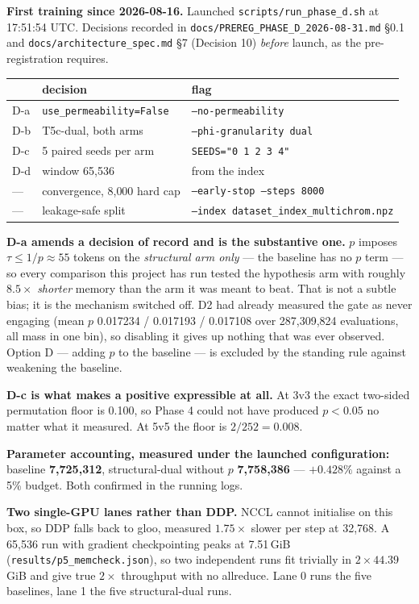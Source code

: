 \documentclass[11pt,a4paper]{article}
\newcommand{\code}[1]{\texttt{\small #1}}
\begin{document}
\textbf{First training since 2026-08-16.} Launched
\code{scripts/run\_phase\_d.sh} at 17:51:54 UTC. Decisions recorded in
\code{docs/PREREG\_PHASE\_D\_2026-08-31.md} \S0.1 and
\code{docs/architecture\_spec.md} \S7 (Decision 10) \emph{before} launch, as the
pre-registration requires.

\begin{center}
\begin{tabular}{lll}
\hline
 & decision & flag \\
\hline
D-a & \code{use\_permeability=False} & \code{--no-permeability} \\
D-b & T5c-dual, both arms & \code{--phi-granularity dual} \\
D-c & 5 paired seeds per arm & \code{SEEDS="0 1 2 3 4"} \\
D-d & window 65{,}536 & from the index \\
--- & convergence, 8{,}000 hard cap & \code{--early-stop --steps 8000} \\
--- & leakage-safe split & \code{--index dataset\_index\_multichrom.npz} \\
\hline
\end{tabular}
\end{center}

\textbf{D-a amends a decision of record and is the substantive one.} $p$
imposes $\tau \le 1/p \approx 55$ tokens on the \emph{structural arm only} ---
the baseline has no $p$ term --- so every comparison this project has run tested
the hypothesis arm with roughly $8.5\times$ \emph{shorter} memory than the arm it
was meant to beat. That is not a subtle bias; it is the mechanism switched off.
D2 had already measured the gate as never engaging (mean $p$ 0.017234 /
0.017193 / 0.017108 over 287{,}309{,}824 evaluations, all mass in one bin), so
disabling it gives up nothing that was ever observed. Option D --- adding $p$ to
the baseline --- is excluded by the standing rule against weakening the baseline.

\textbf{D-c is what makes a positive expressible at all.} At 3v3 the exact
two-sided permutation floor is 0.100, so Phase 4 could not have produced
$p<0.05$ no matter what it measured. At 5v5 the floor is $2/252 = 0.008$.

\textbf{Parameter accounting, measured under the launched configuration:}
baseline \textbf{7{,}725{,}312}, structural-dual without $p$
\textbf{7{,}758{,}386} --- $+0.428\%$ against a 5\% budget. Both confirmed in the
running logs.

\textbf{Two single-GPU lanes rather than DDP.} NCCL cannot initialise on this
box, so DDP falls back to gloo, measured $1.75\times$ slower per step at
32{,}768. A 65{,}536 run with gradient checkpointing peaks at 7.51\,GiB
(\code{results/p5\_memcheck.json}), so two independent runs fit trivially in
$2\times44.39$\,GiB and give true $2\times$ throughput with no allreduce.
Lane 0 runs the five baselines, lane 1 the five structural-dual runs.
\end{document}
